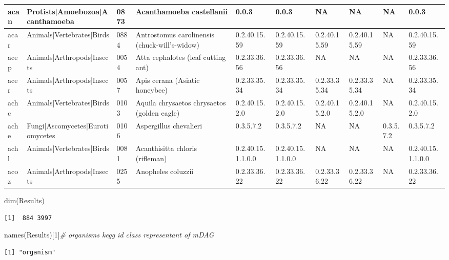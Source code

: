 \documentclass[
  letterpaper,
  DIV=11,
  numbers=noendperiod]{scrreprt}
\newenvironment{Shaded}{}{}
\newcommand{\CommentTok}[1]{\textcolor[rgb]{0.36,0.39,0.44}{\textit{#1}}}
\newcommand{\DecValTok}[1]{\textcolor[rgb]{0.82,0.60,0.40}{#1}}
\newcommand{\FunctionTok}[1]{\textcolor[rgb]{0.38,0.69,0.94}{#1}}
\newcommand{\NormalTok}[1]{\textcolor[rgb]{0.67,0.70,0.75}{#1}}
\begin{document}
\begin{tabular}{l|l|l|l|l|l|l|l|l|l}
\hline
acan & Protists|Amoebozoa|Acanthamoeba & 0873 & Acanthamoeba castellanii & 0.0.3 & 0.0.3 & NA & NA & NA & 0.0.3\\
\hline
acar & Animals|Vertebrates|Birds & 0884 & Antrostomus carolinensis (chuck-will's-widow) & 0.2.40.15.59 & 0.2.40.15.59 & 0.2.40.15.59 & 0.2.40.15.59 & NA & 0.2.40.15.59\\
\hline
acep & Animals|Arthropods|Insects & 0054 & Atta cephalotes (leaf cutting ant) & 0.2.33.36.56 & 0.2.33.36.56 & NA & NA & NA & 0.2.33.36.56\\
\hline
acer & Animals|Arthropods|Insects & 0057 & Apis cerana (Asiatic honeybee) & 0.2.33.35.34 & 0.2.33.35.34 & 0.2.33.35.34 & 0.2.33.35.34 & NA & 0.2.33.35.34\\
\hline
achc & Animals|Vertebrates|Birds & 0103 & Aquila chrysaetos chrysaetos (golden eagle) & 0.2.40.15.2.0 & 0.2.40.15.2.0 & 0.2.40.15.2.0 & 0.2.40.15.2.0 & NA & 0.2.40.15.2.0\\
\hline
ache & Fungi|Ascomycetes|Eurotiomycetes & 0106 & Aspergillus chevalieri & 0.3.5.7.2 & 0.3.5.7.2 & NA & NA & 0.3.5.7.2 & 0.3.5.7.2\\
\hline
achl & Animals|Vertebrates|Birds & 0081 & Acanthisitta chloris (rifleman) & 0.2.40.15.1.1.0.0 & 0.2.40.15.1.1.0.0 & NA & NA & NA & 0.2.40.15.1.1.0.0\\
\hline
acoz & Animals|Arthropods|Insects & 0255 & Anopheles coluzzii & 0.2.33.36.22 & 0.2.33.36.22 & 0.2.33.36.22 & 0.2.33.36.22 & NA & 0.2.33.36.22\\
\hline
\end{tabular}

\begin{Shaded}
\begin{Highlighting}[]
\FunctionTok{dim}\NormalTok{(Results)}
\end{Highlighting}
\end{Shaded}

\begin{verbatim}
[1]  884 3997
\end{verbatim}

\begin{Shaded}
\begin{Highlighting}[]
\FunctionTok{names}\NormalTok{(Results)[}\DecValTok{1}\NormalTok{]}\CommentTok{\# organisms  kegg id  class representant of mDAG}
\end{Highlighting}
\end{Shaded}

\begin{verbatim}
[1] "organism"
\end{verbatim}
\end{document}
